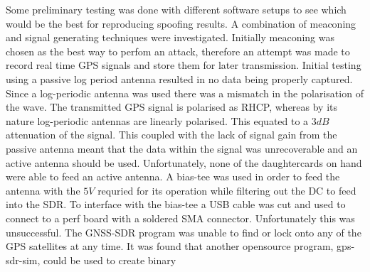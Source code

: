 Some preliminary testing was done with different software setups to see which would be the best for reproducing spoofing results. A combination of meaconing and signal
generating techniques were investigated. Initially meaconing was chosen as the best way to perfom an attack, therefore an attempt was made to record real time GPS signals
and store them for later transmission. Initial testing using a passive log period antenna resulted in no data being properly captured. Since a log-periodic antenna was
used there was a mismatch in the polarisation of the wave. The transmitted GPS signal is polarised as RHCP, whereas by its nature log-periodic antennas are linearly
polarised. This equated to a $3dB$ attenuation of the signal. This coupled with the lack of signal gain from the passive antenna meant that the data within the signal was
unrecoverable and an active antenna should be used. Unfortunately, none of the daughtercards on hand were able to feed an active antenna. A bias-tee was used in order to
feed the antenna with the $5V$ requried for its operation while filtering out the DC to feed into the SDR. To interface with the bias-tee a USB cable was cut and used to
connect to a perf board with a soldered SMA connector. Unfortunately this was unsuccessful. The GNSS-SDR program was unable to find or lock onto any of the GPS satellites
at any time. It was found that another opensource program, gps-sdr-sim, could be used to create binary 